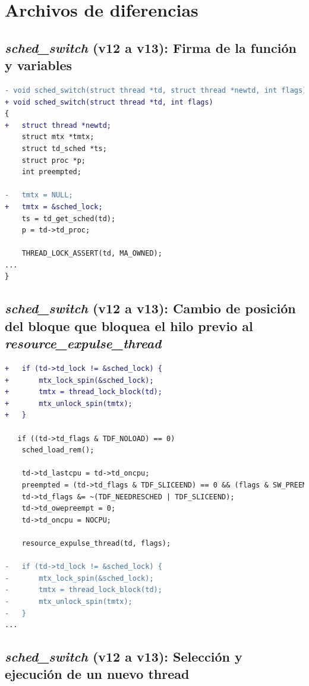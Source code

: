 \appendix

\chapter{Archivos de diferencias}\label{appendix:apA}

\section{\textit{sched\_switch} (v12 a v13): Firma de la función y variables}\label{appendix:apA1}

\begin{lstlisting}[language=diff]
- void sched_switch(struct thread *td, struct thread *newtd, int flags)
+ void sched_switch(struct thread *td, int flags)
{
+   struct thread *newtd;
    struct mtx *tmtx;
    struct td_sched *ts;
    struct proc *p;
    int preempted;

-   tmtx = NULL;
+   tmtx = &sched_lock;
    ts = td_get_sched(td);
    p = td->td_proc;

    THREAD_LOCK_ASSERT(td, MA_OWNED);
...
}
\end{lstlisting}



\section{\textit{sched\_switch} (v12 a v13): Cambio de posición del bloque que bloquea el hilo previo al \textit{resource\_expulse\_thread}}\label{appendix:apA2}

\begin{lstlisting}[language=diff]
+   if (td->td_lock != &sched_lock) {
+   	mtx_lock_spin(&sched_lock);
+   	tmtx = thread_lock_block(td);
+   	mtx_unlock_spin(tmtx);
+   }

   if ((td->td_flags & TDF_NOLOAD) == 0)
   	sched_load_rem();

    td->td_lastcpu = td->td_oncpu;
    preempted = (td->td_flags & TDF_SLICEEND) == 0 && (flags & SW_PREEMPT) != 0;
    td->td_flags &= ~(TDF_NEEDRESCHED | TDF_SLICEEND);
    td->td_owepreempt = 0;
    td->td_oncpu = NOCPU;

    resource_expulse_thread(td, flags);

-   if (td->td_lock != &sched_lock) {
-   	mtx_lock_spin(&sched_lock);
-   	tmtx = thread_lock_block(td);
-   	mtx_unlock_spin(tmtx);
-   }
...
\end{lstlisting}


\section{\textit{sched\_switch} (v12 a v13): Selección y ejecución de un nuevo thread}\label{appendix:apA3}

